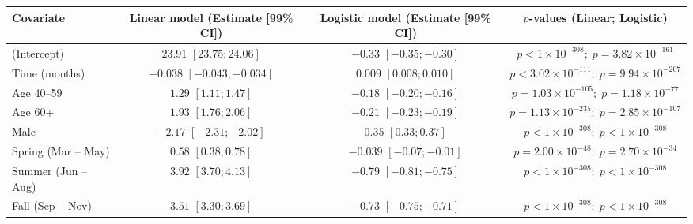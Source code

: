 \documentclass[12pt]{article}
\begin{document}
\begin{appendices}
\begin{table}[h]
\begin{adjustbox}{max width=\textwidth} %
\begin{tabular}{|l|c|c|c|}
\hline
\rowcolor{orange!20} \textbf{Covariate} & \textbf{Linear model (Estimate [99\% CI])} & \textbf{Logistic model (Estimate [99\% CI])} & \textbf{$p$-values (Linear; Logistic)} \\
\hline
(Intercept)         & $23.91$ $[23.75; 24.06]$   & $-0.33$ $[-0.35; -0.30]$   & $p < 1 \times 10^{-308};\; p = 3.82 \times 10^{-161}$\\
Time (months)       & $-0.038$ $[-0.043; -0.034]$ &  $0.009$ $[0.008; 0.010]$  & $p < 3.02 \times 10^{-111};\; p = 9.94 \times 10^{-207}$\\
Age 40--59          & $1.29$ $[1.11; 1.47]$      & $-0.18$ $[-0.20; -0.16]$   & $p = 1.03 \times 10^{-105};\; p = 1.18 \times 10^{-77}$\\
Age 60+             & $1.93$ $[1.76; 2.06]$      & $-0.21$ $[-0.23; -0.19]$   & $p = 1.13 \times 10^{-235};\; p = 2.85 \times 10^{-107}$\\
Male                & $-2.17$ $[-2.31; -2.02]$   & $0.35$ $[0.33; 0.37]$      & $p < 1 \times 10^{-308};\; p < 1 \times 10^{-308}$\\
Spring (Mar -- May)              & $0.58$ $[0.38; 0.78]$      & $-0.039$ $[-0.07; -0.01]$  & $p = 2.00 \times 10^{-48};\; p = 2.70 \times 10^{-34}$\\
Summer (Jun -- Aug)              & $3.92$ $[3.70; 4.13]$      & $-0.79$ $[-0.81; -0.75]$   & $p < 1 \times 10^{-308};\; p < 1 \times 10^{-308}$\\
Fall (Sep -- Nov)                & $3.51$ $[3.30; 3.69]$      & $-0.73$ $[-0.75; -0.71]$   & $p < 1 \times 10^{-308};\; p < 1 \times 10^{-308}$\\
\hline
\end{tabular}
\end{adjustbox}
\end{table}



\end{appendices}
\end{document}
